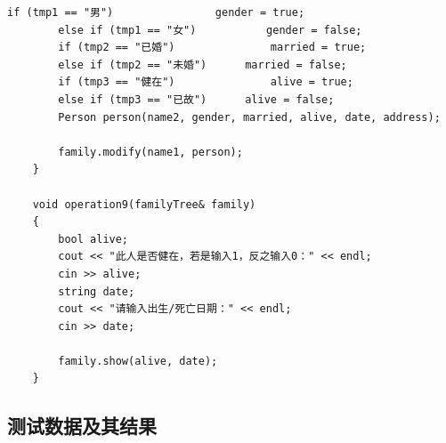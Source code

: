 \documentclass[a4paper,11pt,UTF8]{ctexart}
\begin{document}
\begin{lstlisting}[caption=familytree.cpp,captionpos=b]
        if (tmp1 == "男")				gender = true;
        else if (tmp1 == "女")			gender = false;
        if (tmp2 == "已婚")				married = true;
        else if (tmp2 == "未婚")		married = false;
        if (tmp3 == "健在")				alive = true;
        else if (tmp3 == "已故")		alive = false;
        Person person(name2, gender, married, alive, date, address);

        family.modify(name1, person);
    }

    void operation9(familyTree& family)
    {
        bool alive;
        cout << "此人是否健在，若是输入1，反之输入0：" << endl;
        cin >> alive;
        string date;
        cout << "请输入出生/死亡日期：" << endl;
        cin >> date;

        family.show(alive, date);
    }
\end{lstlisting}
\subsection{测试数据及其结果}
\end{document}
